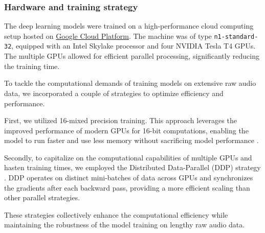 \subsubsection{Hardware and training strategy}

The deep learning models were trained on a high-performance cloud computing setup hosted on \href{https://cloud.google.com/}{Google Cloud Platform}. The machine was of type \texttt{n1-standard-32}, equipped with an Intel Skylake processor and four NVIDIA Tesla T4 GPUs. The multiple GPUs allowed for efficient parallel processing, significantly reducing the training time.

To tackle the computational demands of training models on extensive raw audio data, we incorporated a couple of strategies to optimize efficiency and performance. 

First, we utilized 16-mixed precision training. This approach leverages the improved performance of modern GPUs for 16-bit computations, enabling the model to run faster and use less memory without sacrificing model performance \cite{Das2018MixedOperations}.

Secondly, to capitalize on the computational capabilities of multiple GPUs and hasten training times, we employed the Distributed Data-Parallel (DDP) strategy \cite{Li2020PyTorchTraining}. DDP operates on distinct mini-batches of data across GPUs and synchronizes the gradients after each backward pass, providing a more efficient scaling than other parallel strategies. 

These strategies collectively enhance the computational efficiency while maintaining the robustness of the model training on lengthy raw audio data.

\newpage